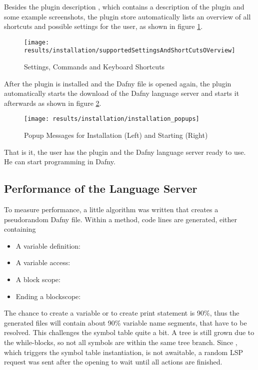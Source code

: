 Besides the plugin description \cite{our-dafny-plugin},
which contains a description of the plugin and some example screenshots,
the plugin store automatically lists an overview of all shortcuts and possible settings for the user,
as shown in figure \ref{fig:supportedSettingsAndShortCutsOVerview}.

\begin{figure}[H]
    \centering
    \texttt{[image: results/installation/supportedSettingsAndShortCutsOVerview]}
    \caption{Settings, Commands and Keyboard Shortcuts}
    \label{fig:supportedSettingsAndShortCutsOVerview}
\end{figure}

After the plugin is installed and the Dafny file is opened again,
the plugin automatically starts the download of the Dafny language server and
starts it afterwards as shown in figure \ref{fig:installation_popups}.

\begin{figure}[H]
    \centering
    \texttt{[image: results/installation/installation\_popups]}
    \caption{Popup Messages for Installation (Left) and Starting (Right)}
    \label{fig:installation_popups}
\end{figure}

That is it, the user has the plugin and the Dafny language server ready to use.
He can start programming in Dafny.

\subsection{Performance of the Language Server}
To measure performance, a little algorithm was written that creates a pseudorandom Dafny file.
Within a method, code lines are generated, either containing
\begin{itemize}
    \item A variable definition: 
    \item A variable access: 
    \item A block scope: 
    \item Ending a blockscope: \code{\}}
\end{itemize}
The chance to create a variable or to create print statement is 90\%, thus the generated files will contain about 90\% variable name segments, that have to be resolved.
This challenges the symbol table quite a bit.
A tree is still grown due to the while-blocks, so not all symbols are within the same tree branch.
Since , which triggers the symbol table instantiation, is not awaitable, a random LSP request was sent after the opening to wait until all actions are finished.

